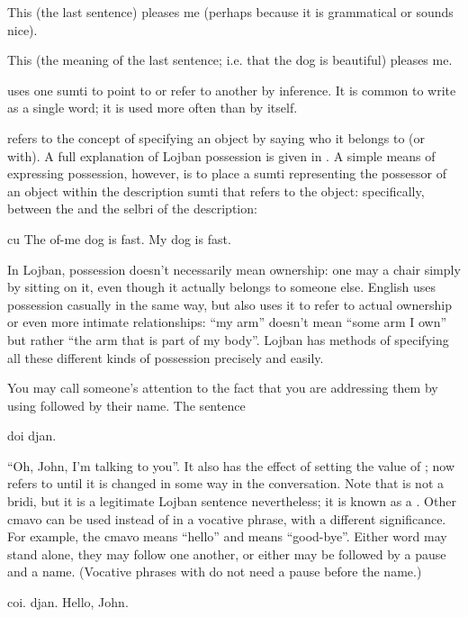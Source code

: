 \begin{example}
   \n
This (the last sentence) pleases me (perhaps because it is grammatical or sounds nice).
\end{example}

\begin{example}
   \n
This (the meaning of the last sentence; i.e. that the dog is beautiful) pleases me.
\end{example}

 uses one sumti to point to or refer to another by inference. It is common to write  as a single word; it is used more often than  by itself.



 refers to the concept of specifying an object by saying who it belongs to (or with). A full explanation of Lojban possession is given in . A simple means of expressing possession, however, is to place a sumti representing the possessor of an object within the description sumti that refers to the object: specifically, between the  and the selbri of the description:
\begin{example}
 cu \n
The of-me dog is fast.\n
My dog is fast.
\end{example}

In Lojban, possession doesn't necessarily mean ownership: one may  a chair simply by sitting on it, even though it actually belongs to someone else. English uses possession casually in the same way, but also uses it to refer to actual ownership or even more intimate relationships: ``my arm'' doesn't mean ``some arm I own'' but rather ``the arm that is part of my body''. Lojban has methods of specifying all these different kinds of possession precisely and easily.



You may call someone's attention to the fact that you are
  addressing them by using  followed by their name. The
  sentence
\begin{example}
doi djan.
\end{example}

 ``Oh, John, I'm talking to you''. It also has the effect of setting the value of ;  now refers to  until it is changed in some way in the conversation. Note that  is not a bridi, but it is a legitimate Lojban sentence nevertheless; it is known as a . Other cmavo can be used instead of  in a vocative phrase, with a different significance. For example, the cmavo  means ``hello'' and  means ``good-bye''. Either word may stand alone, they may follow one another, or either may be followed by a pause and a name. (Vocative phrases with  do not need a pause before the name.)
\begin{example}
coi. djan.\n
Hello, John.
\end{example}

